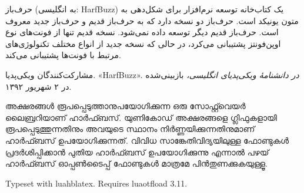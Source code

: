 \documentclass{article}
\begin{document}
حرف‌باز (به انگلیسی: HarfBuzz) یک کتاب‌خانه توسعه نرم‌افزار برای
شکل‌دهی به متون یونیکد است. حرف‌باز دو نسخه دارد که به حرف‌باز قدیم و
حرف‌باز جدید معروف است. حرف‌باز قدیم دیگر توسعه داده نمی‌شود. نسخه قدیم
تنها از فونت‌های نوع اوپن‌فونتز پشتیبانی می‌کرد، در حالی که نسخه جدید
از انواع مختلف تکنولوژی‌های مرتبط با فونت‌ها پشتیبانی می‌کند.

\medskip
\small

مشارکت‌کنندگان ویکی‌پدیا. «HarfBuzz». \textit{در دانشنامهٔ ویکی‌پدیای انگلیسی،}
بازبینی‌شده در ۲ شهریور ۱۳۹۲.

\normalsize
\medskip
{}

അക്ഷരങ്ങൾ രൂപപ്പെടുത്താനുപയോഗിക്കുന്ന ഒരു സോഫ്റ്റ്‍വെയർ ലൈബ്രറിയാണ്
ഹാർഫ്ബസ്. യുണികോഡ് അക്ഷരങ്ങളെ ഗ്ലിഫുകളായി രൂപപ്പെടുത്തുന്നതിനും അവയുടെ
സ്ഥാനം നിർണ്ണയിക്കുന്നതിനുമാണ് ഹാർഫ്ബസ് ഉപയോഗിക്കുന്നത്. വിവിധ
സാങ്കേതിവിദ്യയിലുള്ള ഫോണ്ടുകൾ പ്രദർശിപ്പിക്കാൻ പുതിയ ഹാർഫ്ബസ്
ഉപയോഗിക്കുന്നു എന്നാൽ പഴയ് ഹാർഫ്ബസ് ഓപ്പൺടൈപ്പ് ഫോണ്ടുകൾ മാത്രമേ
പിൻതുണക്കുകയുള്ളൂ.

\medskip

Typeset with luahblatex. Requires luaotfload 3.11.
\end{document}
